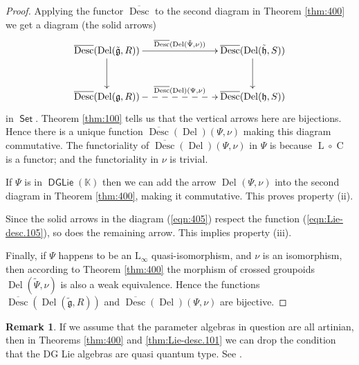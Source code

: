 \documentclass[a4paper, 10pt]{amsart}
\theoremstyle{definition}
\newtheorem{rem}[equation]{Remark}
\numberwithin{equation}{section}
\newcommand{\opn}{\operatorname}
\newcommand{\cat}[1]{\operatorname{\mathsf{#1}}}
\newcommand{\ol}{\overline}
\newcommand{\mfrak}[1]{\mathfrak{#1}}
\newcommand{\mrm}[1]{\mathrm{#1}}
\newcommand{\mbb}[1]{\mathbb{#1}}
\newcommand{\til}[1]{\tilde{#1}}
\newcommand{\K}{\mbb{K}}
\newcommand{\g}{\mfrak{g}}
\newcommand{\h}{\mfrak{h}}
\begin{document}
\begin{proof}
Applying the functor $\ol{\opn{Desc}}$ to the second diagram in Theorem 
\ref{thm:400}  we get a diagram (the solid arrows) 
\begin{equation} \label{eqn:405}
\UseTips \xymatrix @C=18ex @R=7ex {
\ol{\opn{Desc}}(\opn{Del}(\til{\g}, R))
\ar[d]
\ar[r]^(0.5){\ol{\opn{Desc}}(\opn{Del}(\til{\Psi}, \nu))}
&
\ol{\opn{Desc}}(\opn{Del}(\til{\h}, S))
\ar[d]
\\
\ol{\opn{Desc}}(\opn{Del}(\g, R))
\ar@{-->}[r]^(0.5){\ol{\opn{Desc}}(\opn{Del})(\Psi, \nu)}
&
\ol{\opn{Desc}}(\opn{Del}(\h, S))
} 
\end{equation}
in $\cat{Set}$.
Theorem \ref{thm:100} tells us that the vertical arrows here are bijections.
Hence there is a unique function 
$\ol{\opn{Desc}}(\opn{Del})(\Psi, \nu)$ making
this diagram commutative. 
The functoriality of $\ol{\opn{Desc}}(\opn{Del})(\Psi, \nu)$
in $\Psi$ is because $\opn{L} \circ \opn{C}$ is a functor; and the
functoriality in $\nu$ is trivial.

If $\Psi$ is in $\cat{DGLie}(\K)$ then we can add the arrow 
$\opn{Del}^{}(\Psi, \nu)$ into the second diagram in Theorem 
\ref{thm:400}, making it commutative. This proves property (ii). 

Since the solid arrows in the diagram (\ref{eqn:405}) 
respect the function (\ref{eqn:Lie-desc.105}), so does the remaining arrow.
This implies property (iii). 

Finally, if $\Psi$ happens to be an $\mrm{L}_{\infty}$
quasi-isomorphism, and $\nu$ is an isomorphism, then according to 
Theorem \ref{thm:400} the morphism of crossed groupoids
$\opn{Del}(\til{\Psi}, \nu)$ is also a weak equivalence.
Hence the functions
$\ol{\opn{Desc}}(\opn{Del}(\til{\g}, R))$
and 
$\ol{\opn{Desc}}(\opn{Del})(\Psi, \nu)$ are bijective.
\end{proof}

\begin{rem}
If we assume that the parameter algebras in question are all artinian, then in
Theorems \ref{thm:400} and \ref{thm:Lie-desc.101} we can
drop the condition that the DG Lie algebras are quasi quantum type. See
\cite[Theorem 6.13]{Ye7}. 
\end{rem}
\end{document}

